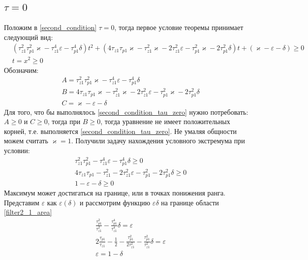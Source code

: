\documentclass[a4paper,14pt]{extarticle} %
\begin{document}
\subsection{$\tau = 0$}
Положим в \eqref{second_condition} $\tau = 0$, тогда первое условие теоремы принимает следующий вид:
 \begin{equation}\label{second_condition_tau_zero}
 \begin{aligned}
&(\tau_{z1}^2\tau_{p1}^2\varkappa - \tau_{z1}^4\varepsilon - \tau_{p1}^4\delta)t^2 +( 4\tau_{z1}\tau_{p1}\varkappa - \tau_{z1}^2\varkappa - 2\tau_{z1}^2\varepsilon - \tau_{p1}^2\varkappa - 2\tau_{p1}^2\delta)t + (\varkappa-\varepsilon - \delta)  \geq 0\\
&t = x^2 \geq 0
 \end{aligned}
\end{equation}
Обозначим:
 \begin{equation}
 \begin{aligned}
&A = \tau_{z1}^2\tau_{p1}^2\varkappa - \tau_{z1}^4\varepsilon - \tau_{p1}^4\delta\\
&B = 4\tau_{z1}\tau_{p1}\varkappa - \tau_{z1}^2\varkappa - 2\tau_{z1}^2\varepsilon - \tau_{p1}^2\varkappa - 2\tau_{p1}^2\delta\\
&C = \varkappa-\varepsilon - \delta
 \end{aligned}
\end{equation}
Для того, что бы выполнялось \eqref{second_condition_tau_zero} нужно потребовать: $A \geq 0$ и $C \geq 0$, тогда  при $B \geq 0$, тогда уравнение не имеет положительных корней, т.е. выполняется \eqref{second_condition_tau_zero}. Не умаляя общности можем считать $\varkappa = 1$. Получили задачу нахождения условного экстремума при условии:
 \begin{equation}\label{filter2_1_area}
 \begin{aligned}
&\tau_{z1}^2\tau_{p1}^2 - \tau_{z1}^4\varepsilon - \tau_{p1}^4\delta \geq 0\\
&4\tau_{z1}\tau_{p1} - \tau_{z1}^2 - 2\tau_{z1}^2\varepsilon - \tau_{p1}^2 - 2\tau_{p1}^2\delta \geq 0\\
&1-\varepsilon - \delta \geq 0
 \end{aligned}
\end{equation}
Максимум может достигаться на границе, или в точках понижения ранга. Представим $\varepsilon$ как $\varepsilon(\delta)$ и рассмотрим функцию $\varepsilon\delta$ на границе области \eqref{filter2_1_area}
 \begin{equation}\label{filter2_1_area_border}
 \begin{aligned}
&\frac{\tau_{p1}^2}{\tau_{z1}^2} - \frac{\tau_{p1}^4}{\tau_{z1}^4}\delta =\varepsilon\\
&2\frac{\tau_{p1}}{\tau_{z1}} - \frac{1}{2} - \frac{\tau_{p1}^2}{2\tau_{z1}^2} - \frac{\tau_{p1}^2}{\tau_{z1}^2}\delta =  \varepsilon\\
&\varepsilon = 1 - \delta
 \end{aligned}
\end{equation}
\end{document}
